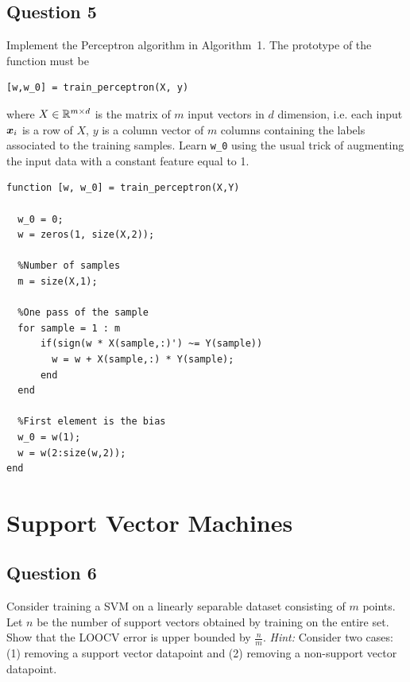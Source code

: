 \documentclass{article}
\begin{document}
\subsection{Question 5}
Implement the Perceptron algorithm in Algorithm~1. The prototype of the function must be 
\begin{verbatim}
[w,w_0] = train_perceptron(X, y)
\end{verbatim}
where $X \in \mathbb{R}^{m \times d}$ is the matrix of $m$ input vectors in $d$ dimension, i.e. each input $\boldsymbol{x}_i$ is a row of $X$, $y$ is a column vector of $m$ columns containing the labels associated to the training samples. Learn \verb|w_0| using the usual trick of augmenting the input data with a constant feature equal to 1.

\begin{verbatim}
function [w, w_0] = train_perceptron(X,Y)

  w_0 = 0;
  w = zeros(1, size(X,2));
  
  %Number of samples
  m = size(X,1);
  
  %One pass of the sample
  for sample = 1 : m
      if(sign(w * X(sample,:)') ~= Y(sample))
        w = w + X(sample,:) * Y(sample);
      end
  end
  
  %First element is the bias
  w_0 = w(1);
  w = w(2:size(w,2));
end
\end{verbatim}

\section{Support Vector Machines}

\subsection{Question 6}
Consider training a SVM on a linearly separable dataset consisting of $m$ points. Let $n$ be the number of support vectors obtained by training on the entire set. Show that the LOOCV error is upper bounded by $\frac{n}{m}$.
\textsl{Hint:} Consider two cases: (1) removing a support vector datapoint and (2) removing a non-support vector datapoint.\\
\end{document}
